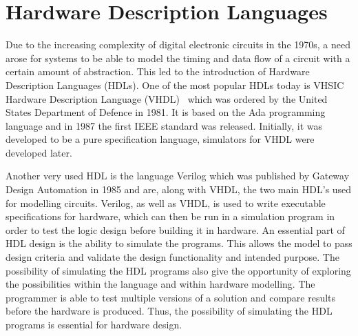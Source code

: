 \section{Hardware Description Languages}
Due to the increasing complexity of digital electronic circuits in the 1970s, a need arose for systems to be able to model the timing and data flow of a circuit with a certain amount of abstraction. This led to the introduction of Hardware Description Languages (HDLs). One of the most popular HDLs today is VHSIC Hardware Description Language (VHDL)~\cite{VHDL92,VHDL98} which was ordered by the United States Department of Defence in 1981. It is based on the Ada programming language and in 1987 the first IEEE standard was released. Initially, it was developed to be a pure specification language, simulators for VHDL were developed later.

Another very used HDL is the language Verilog which was published by Gateway Design Automation in 1985 and are, along with VHDL, the two main HDL's used for modelling circuits.
Verilog, as well as VHDL, is used to write executable specifications for hardware, which can then be run in a simulation program in order to test the logic design before building it in hardware. An essential part of HDL design is the ability to simulate the programs. This allows the model to pass design criteria and validate the design functionality and intended purpose. The possibility of simulating the HDL programs also give the opportunity of exploring the possibilities within the language and within hardware modelling. The programmer is able to test multiple versions of a solution and compare results before the hardware is produced. Thus, the possibility of simulating the HDL programs is essential for hardware design.


